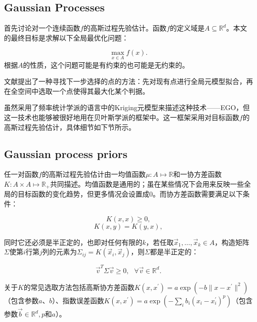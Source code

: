 \documentclass[index]{subfiles}
\begin{document}
\subsection{Gaussian Processes}

首先讨论对一个连续函数$f$的高斯过程先验估计。函数$f$的定义域是$A \subseteq \mathbb{R}^{d}$。本文的最终目标是求解以下全局最优化问题：

\begin{equation}
\max_{x \in A} f(x).
\end{equation}
根据$A$的性质，这个问题可能是有约束的也可能是无约束的。

文献提出了一种寻找下一步选择的点的方法：先对现有点进行全局元模型拟合，再在全空间中选取一个点使得其最大化某个判据。

虽然采用了频率统计学派的语言中的Kriging元模型来描述这种技术——EGO，但这一技术也能够被很好地用在贝叶斯学派的框架中。这一框架采用对目标函数$f$的高斯过程先验估计，具体细节如下节所示。

\subsection{Gaussian process priors}

任一对函数$f$的高斯过程先验估计由一均值函数$\mu : A \mapsto \mathbb{R}$和一协方差函数$K : A \times A \mapsto \mathbb{R}_{+}$共同描述。均值函数是通用的；虽在某些情况下会用来反映一些全局的目标函数的变化趋势，但更多情况会设置成0。而协方差函数需要满足以下条件：

\begin{equation}K(x,x) \geq 0,\end{equation}
\begin{equation}K(x,y) = K(y,x),\end{equation}

同时它还必须是半正定的，也即对任何有限的$k$，若任取$\vec{x}_{1}, \ldots, \vec{x}_{k} \in A$，构造矩阵$\Sigma$使第$i$行第$j$列的元素为$\Sigma_{ij} = K(\vec{x}_{i}, \vec{x}_{j})$，则$\Sigma$都是半正定的：

\begin{equation}\vec{v}^{T}\Sigma \vec{v} \geq 0, \ \ \ \forall \vec{v} \in \mathbb{R}^{d}.\end{equation}

关于$K$的常见选取方法包括高斯协方差函数$K(x,x^{\prime}) = a \exp(-b \| x - x^{\prime}\|^{2})$（包含参数$a$、$b$）、指数误差函数$K(x, x^{\prime}) = a \exp(-\sum_{i} b_{i} (x_{i} - x_{i}^{\prime})^{p})$（包含参数$\vec{b} \in \mathbb{R}^{d}, p$和$a$）。
\end{document}
